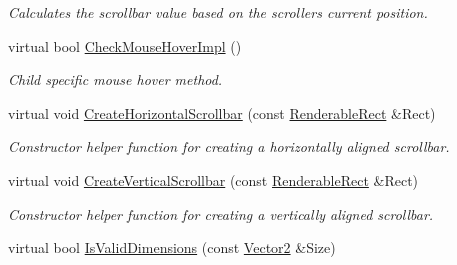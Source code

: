 \begin{DoxyCompactItemize}
\begin{DoxyCompactList}\small\item\em Calculates the scrollbar value based on the scrollers current position. \item\end{DoxyCompactList}\item 
\hypertarget{classMezzanine_1_1UI_1_1Scrollbar_a64337a5b0f1129a689367f50fcf54717}{
virtual bool \hyperlink{classMezzanine_1_1UI_1_1Scrollbar_a64337a5b0f1129a689367f50fcf54717}{CheckMouseHoverImpl} ()}
\label{classMezzanine_1_1UI_1_1Scrollbar_a64337a5b0f1129a689367f50fcf54717}

\begin{DoxyCompactList}\small\item\em Child specific mouse hover method. \item\end{DoxyCompactList}\item 
\hypertarget{classMezzanine_1_1UI_1_1Scrollbar_ae25551baee2d2de1e6dade27770fef44}{
virtual void \hyperlink{classMezzanine_1_1UI_1_1Scrollbar_ae25551baee2d2de1e6dade27770fef44}{CreateHorizontalScrollbar} (const \hyperlink{structMezzanine_1_1UI_1_1RenderableRect}{RenderableRect} \&Rect)}
\label{classMezzanine_1_1UI_1_1Scrollbar_ae25551baee2d2de1e6dade27770fef44}

\begin{DoxyCompactList}\small\item\em Constructor helper function for creating a horizontally aligned scrollbar. \item\end{DoxyCompactList}\item 
\hypertarget{classMezzanine_1_1UI_1_1Scrollbar_ac67779873aec435bc65bb3102e748f44}{
virtual void \hyperlink{classMezzanine_1_1UI_1_1Scrollbar_ac67779873aec435bc65bb3102e748f44}{CreateVerticalScrollbar} (const \hyperlink{structMezzanine_1_1UI_1_1RenderableRect}{RenderableRect} \&Rect)}
\label{classMezzanine_1_1UI_1_1Scrollbar_ac67779873aec435bc65bb3102e748f44}

\begin{DoxyCompactList}\small\item\em Constructor helper function for creating a vertically aligned scrollbar. \item\end{DoxyCompactList}\item 
\hypertarget{classMezzanine_1_1UI_1_1Scrollbar_a6c15813b1c263c4426de1d96c9cb8dcd}{
virtual bool \hyperlink{classMezzanine_1_1UI_1_1Scrollbar_a6c15813b1c263c4426de1d96c9cb8dcd}{IsValidDimensions} (const \hyperlink{classMezzanine_1_1Vector2}{Vector2} \&Size)}
\label{classMezzanine_1_1UI_1_1Scrollbar_a6c15813b1c263c4426de1d96c9cb8dcd}


\end{DoxyCompactItemize}

